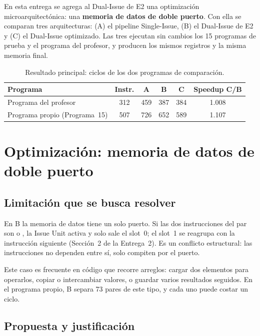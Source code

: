 \documentclass[11pt,a4paper]{article}
\newcommand{\sig}[1]{\texttt{\detokenize{#1}}}
\begin{document}
En esta entrega se agrega al Dual-Issue de E2 una optimización microarquitectónica: una \textbf{memoria de datos de doble puerto}. Con ella se comparan tres arquitecturas: (A) el pipeline Single-Issue, (B) el Dual-Issue de E2 y (C) el Dual-Issue optimizado. Las tres ejecutan sin cambios los 15 programas de prueba y el programa del profesor, y producen los mismos registros y la misma memoria final.

\begin{table}[htbp]
\centering
\caption{Resultado principal: ciclos de los dos programas de comparación.}
\label{tab:ef-resumen}
\begin{tabular}{l c c c c c}
\toprule
\textbf{Programa} & \textbf{Instr.} & \textbf{A} & \textbf{B} & \textbf{C} & \textbf{Speedup C/B} \\
\midrule
Programa del profesor & 312 & 459 & 387 & 384 & 1.008 \\
Programa propio (Programa~15) & 507 & 726 & 652 & 589 & 1.107 \\
\bottomrule
\end{tabular}
\end{table}

\section{Optimización: memoria de datos de doble puerto}

\subsection{Limitación que se busca resolver}

En B la memoria de datos tiene un solo puerto. Si las dos instrucciones del par son \sig{lw} o \sig{sw}, la Issue Unit activa \sig{MemConflict} y solo sale el slot~0; el slot~1 se reagrupa con la instrucción siguiente (Sección~2 de la Entrega~2). Es un conflicto estructural: las instrucciones no dependen entre sí, solo compiten por el puerto.

Este caso es frecuente en código que recorre arreglos: cargar dos elementos para operarlos, copiar o intercambiar valores, o guardar varios resultados seguidos. En el programa propio, B separa 73 pares de este tipo, y cada uno puede costar un ciclo.

\subsection{Propuesta y justificación}
\end{document}

